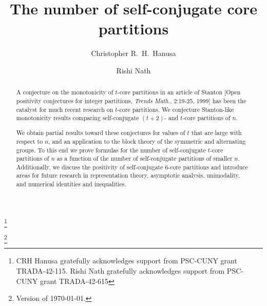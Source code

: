 \documentclass[12pt,leqno]{amsart}
\numberwithin{equation}{section}
\theoremstyle{definition}
\begin{document}
\title{The number of self-conjugate core partitions}

\author{Christopher R.\ H.\ Hanusa}
\address{Department of Mathematics\\
Queens College (CUNY)\\
6530 Kissena Blvd.\ \\
Flushing, NY 11367, U.S.A.\ \\
phone: +1-718-997-5964}

\author{Rishi Nath}
\address{Department of Mathematics and Computer Science\\
York College (CUNY)\\
Jamaica, NY 11451, U.S.A.\ \\
phone: +1-718-262-2543}

\thanks{CRH Hanusa gratefully acknowledges support from PSC-CUNY grant TRADA-42-115. Rishi Nath gratefully acknowledges support from PSC-CUNY grant TRADA-42-615}

\begin{abstract}
A conjecture on the monotonicity of $t$-core partitions in an article of Stanton [Open positivity conjectures for integer partitions, {\em Trends Math}., 2:19-25, 1999] has been the catalyst for much recent research on $t$-core partitions.  We conjecture Stanton-like monotonicity results comparing self-conjugate $(t+2)$- and $t$-core partitions of $n$.

We obtain partial results toward these conjectures for values of $t$ that are large with respect to $n$, and an application to the block theory of the symmetric and alternating groups.  To this end we prove formulas for the number of self-conjugate $t$-core partitions of $n$ as a function of the number of self-conjugate partitions of smaller $n$.  Additionally, we discuss the positivity of self-conjugate $6$-core partitions and introduce areas for future research in representation theory, asymptotic analysis, unimodality, and numerical identities and inequalities.
\end{abstract}



\thanks{Version of \today.}

\maketitle
\pagestyle{headings}
\end{document}
